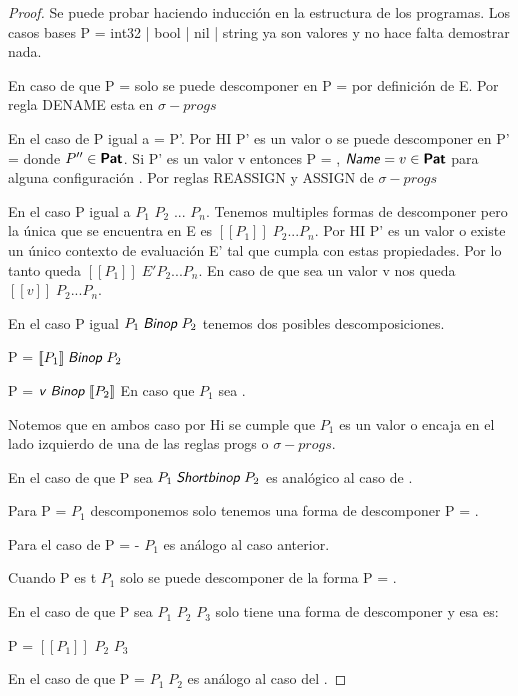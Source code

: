 \begin{proof}
Se puede probar haciendo inducción en la estructura de los programas.
Los casos bases P = int32 | bool | nil | string ya son valores y no hace falta demostrar nada.

En caso de que P =  solo se puede descomponer en P =  por definición de E. Por regla DENAME esta en $\sigma-progs$

En el caso de P igual a  = P'.
Por HI P' es un valor o se puede descomponer en P' = 
donde $P'' \in \textsf{\textbf{Pat}}$.
Si P' es un valor v entonces P = , $\textsf{\textit{Name}} = v \in \textsf{\textbf{Pat}}$ para alguna configuración .
Por reglas REASSIGN y ASSIGN de $\sigma-progs$

En el caso P igual a $P_{1}$ $P_{2}$ ... $P_{n}$. Tenemos multiples formas de descomponer pero la única que se encuentra en E es
$[\![P_{1}]\!] \; P_{2} ... P_{n}$. Por HI P' es un valor o existe un único contexto de evaluación E' tal que cumpla con estas propiedades.
Por lo tanto queda $[\![P_{1}]\!] \; E' P_{2} ... P_{n}$. En caso de que sea un valor v nos queda $[\![v]\!] \; P_{2} ... P_{n}$.

En el caso P igual $P_{1} \; \textsf{\textit{Binop}} \; P_{2}$ tenemos dos posibles descomposiciones.

P = $[\![P_{1}]\!] \; \textsf{\textit{Binop}} \; P_{2}$ 

P = $\textsf{\textit{v}} \; \textsf{\textit{Binop}} \; [\![P_{2}]\!]$ En caso que $P_{1}$ sea .

Notemos que en ambos caso por Hi se cumple que $P_{1}$ es un valor o encaja en el lado izquierdo de una de las reglas progs o $\sigma-progs$.

En el caso de que P sea $P_{1} \; \textsf{\textit{Shortbinop}} \; P_{2}$ es analógico al caso de .

Para P =  $P_{1}$ descomponemos solo tenemos una forma de descomponer P = .

Para el caso de P = - $P_{1}$ es análogo al caso anterior.

Cuando P es  t $P_{1}$ solo se puede descomponer de la forma P = .

En el caso de que P sea  $P_{1}$  $P_{2}$  $P_{3}$ solo tiene una forma de descomponer y esa es:

P =  $[\![P_{1}]\!]$  $P_{2}$  $P_{3}$

En el caso de que P =  $P_{1} \; P_{2}$ es análogo al caso del .




\end{proof}